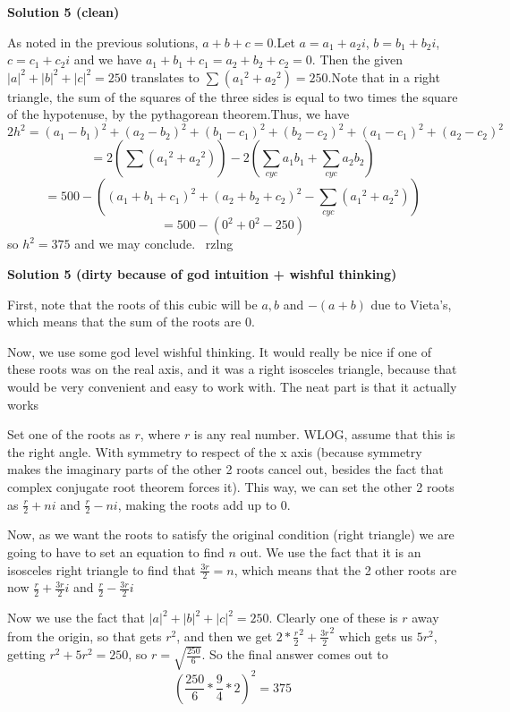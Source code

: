 \begin{enumerate}
 



\textbf{Solution 5 (clean)}

As noted in the previous solutions, $a+b+c = 0$.Let $a = a_1+a_2 i$, $b = b_1+b_2 i$, $c = c_1+c_2 i$ and we have $a_1 + b_1 + c_1 = a_2 + b_2 + c_2 = 0$. Then the given $|a|^2 + |b|^2 + |c|^2 = 250$ translates to $\sum_{} ( {a_1}^2 + {a_2}^2 ) = 250.$Note that in a right triangle, the sum of the squares of the three sides is equal to two times the square of the hypotenuse, by the pythagorean theorem.Thus, we have 
 \[2h^2 = (a_1 - b_1)^2 + (a_2 - b_2)^2 + (b_1 - c_1)^2 + (b_2 - c_2)^2 + (a_1 - c_1)^2 + (a_2 - c_2)^2\] 
 \[= 2 \left( \sum_{} ( {a_1}^2 + {a_2}^2 )  \right) - 2 \left( \sum_{cyc} a_1 b_1 + \sum_{cyc} a_2 b_2 \right)\]
 \[= 500 - \left( (a_1 + b_1 + c_1)^2 + (a_2 + b_2 + c_2)^2 -  \sum_{cyc} ( {a_1}^2 + {a_2}^2 )     \right)\]
 \[= 500 - (0^2 + 0^2 - 250)\]so $h^2 = \boxed{375}$ and we may conclude.~ rzlng

 



\textbf{Solution 5 (dirty because of god intuition + wishful thinking)}

First, note that the roots of this cubic will be $a, b$ and $-(a+b)$ due to Vieta's, which means that the sum of the roots are 0.

 Now, we use some god level wishful thinking. It would really be nice if one of these roots was on the real axis, and it was a right isosceles triangle, because that would be very convenient and easy to work with. The neat part is that it actually works

 Set one of the roots as $r$, where $r$ is any real number. WLOG, assume that this is the right angle. With symmetry to respect of the x axis (because symmetry makes the imaginary parts of the other 2 roots cancel out, besides the fact that complex conjugate root theorem forces it). This way, we can set the other 2 roots as $\frac{r}{2}+ni$ and $\frac{r}{2}-ni$, making the roots add up to 0. 

 Now, as we want the roots to satisfy the original condition (right triangle) we are going to have to set an equation to find $n$ out. We use the fact that it is an isosceles right triangle to find that $\frac{3r}{2}=n$, which means that the 2 other roots are now $\frac{r}{2}+\frac{3r}{2}i$ and $\frac{r}{2}-\frac{3r}{2}i$

 Now we use the fact that $|a|^2+|b|^2+|c|^2=250$. Clearly one of these is $r$ away from the origin, so that gets $r^2$, and then we get $2*\frac{r}{2}^2+\frac{3r}{2}^2$ which gets us $5r^2$, getting $r^2+5r^2=250$, so $r=\sqrt{\frac{250}{6}}$. So the final answer comes out to
 \[(\frac{250}{6}*\frac{9}{4}*2)^2=\boxed{\boxed{375}}\]


\end{enumerate}
